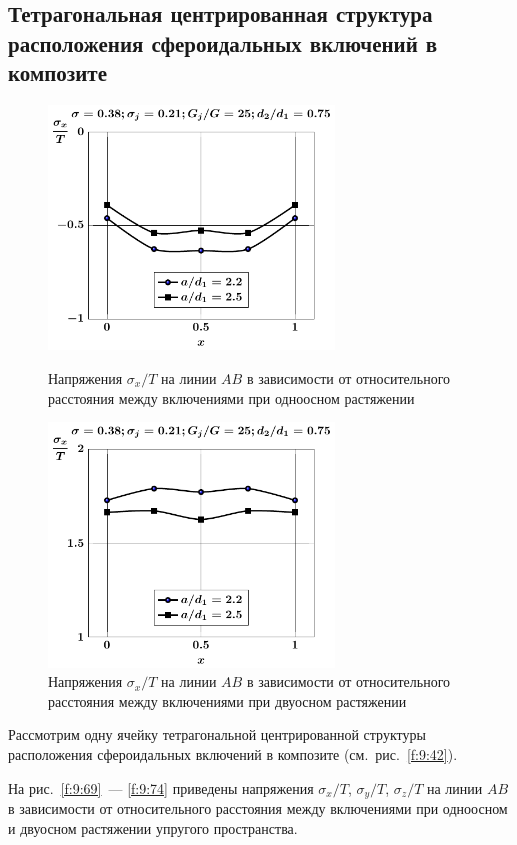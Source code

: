 \subsection{Тетрагональная центрированная структура расположения сфероидальных включений в композите}

\begin{figure}[h!]
\centering\footnotesize
\parbox[b]{7.5cm}{\centering\includegraphics[width=7.6cm]{inc9-a-d75-g25-t1-sig_x.pdf}
\caption{Напряжения $\sigma_x/T$ на линии $AB$ в зависимости от относительного расстояния между включениями при одноосном растяжении
\label{f:9:69}}}\hfil\hfil
\parbox[b]{7.5cm}{\centering\includegraphics[width=7.6cm]{inc9-a-d75-g25-t2-sig_x.pdf}
\caption{Напряжения $\sigma_x/T$ на линии $AB$ в зависимости от относительного расстояния между включениями при двуосном растяжении
\label{f:9:70}}}
\end{figure}

Рассмотрим одну ячейку тетрагональной центрированной структуры расположения сфероидальных включений в композите (см.~рис.~\ref{f:9:42}).

На рис.~\ref{f:9:69}~--- \ref{f:9:74} приведены напряжения $\sigma_x/T$, $\sigma_y/T$, $\sigma_z/T$ на линии $AB$ в зависимости от относительного расстояния между включениями при одноосном и двуосном растяжении упругого пространства.

